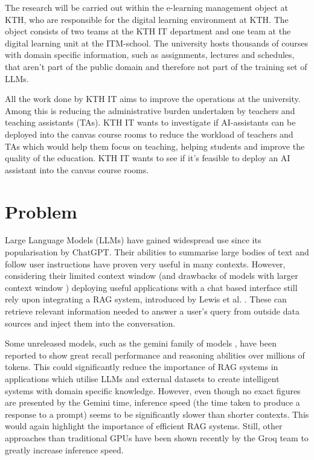 The research will be carried out within the e-learning management object at KTH, who are responsible for the digital learning environment at KTH. The object consists of two teams at the KTH IT department and one team at the digital learning unit at the ITM-school. The university hosts thousands of courses with domain specific information, such as
assignments, lectures and schedules, that aren’t part of the public domain and therefore not part of the training set of LLMs.

All the work done by KTH IT aims to improve the operations at the university. Among this is reducing the administrative burden undertaken by teachers and teaching assistants (TAs). KTH IT wants to investigate if AI-assistants can be deployed into the canvas course rooms to reduce the workload of teachers and TAs which would help them focus on teaching, helping students and improve the quality of the education. KTH IT wants to see if it’s feasible to deploy an AI assistant into the canvas course rooms.

\section{Problem}
\label{sec:problem}


Large Language Models (LLMs) have gained widespread use since its popularisation by ChatGPT. Their abilities to summarise large bodies of text and follow user instructions have proven very useful in many contexts. However, considering their limited context window (and drawbacks of models with larger context window \cite{liu_lost_2023}) deploying useful applications with a chat based interface still rely upon integrating a RAG system, introduced by Lewis et al. \cite{lewis_retrieval-augmented_2021}. These can retrieve relevant information needed to answer a user's query from outside data sources and inject them into the conversation.

Some unreleased models, such as the gemini family of models \cite{gemini_team_gemini_2023}, have been reported to show great recall performance and reasoning abilities over millions of tokens. This could significantly reduce the importance of RAG systems in applications which utilise LLMs and external datasets to create intelligent systems with domain specific knowledge. However, even though no exact figures are presented by the Gemini time, inference speed (the time taken to produce a response to a prompt) seems to be significantly slower than shorter contexts. This would again highlight the importance of efficient RAG systems. Still, other approaches than traditional GPUs have been shown recently \cite{abts_software-defined_2022} by the Groq team to greatly increase inference speed.

